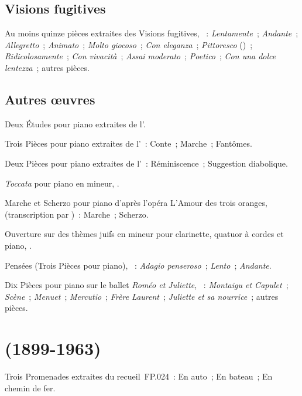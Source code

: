 \subsection{Visions fugitives}

Au moins quinze pièces extraites des Visions fugitives, ~:
 \emph{Lentamente}~;  \emph{Andante}~; 
\emph{Allegretto}~;  \emph{Animato}~;  \emph{Molto
giocoso}~;  \emph{Con eleganza}~;  \emph{Pittoresco}
()~;  \emph{Ridicolosamente}~; 
\emph{Con vivacità}~;  \emph{Assai moderato}~; 
\emph{Poetico}~;  \emph{Con una dolce lentezza}~; autres pièces.

\subsection{Autres œuvres}

Deux Études pour piano extraites de l'.

Trois Pièces pour piano extraites de l'~:  Conte~;
 Marche~;  Fantômes.

Deux Pièces pour piano extraites de l'~:  Réminiscence~;
 Suggestion diabolique.

\emph{Toccata} pour piano en \kD mineur, .

Marche et Scherzo pour piano d'après l'opéra L'\hbox{Amour} des trois
oranges,  (transcription par \Prokofiev{})~:  Marche~;
 Scherzo.

Ouverture sur des thèmes juifs en \kC mineur pour clarinette, quatuor à
cordes et piano, .

Pensées (Trois Pièces pour piano), ~:  \emph{Adagio
penseroso}~;  \emph{Lento}~;  \emph{Andante}.

Dix Pièces pour piano sur le ballet \emph{Roméo et Juliette}, ~:
\emph{Montaigu et Capulet}~; \emph{Scène}~; \emph{Menuet}~;
\emph{Mercutio}~; \emph{Frère Laurent}~; \emph{Juliette et sa nourrice}~;
autres pièces.

\section[%
Francis Poulenc (1899-1963)]{%
\FPoulenc{} (1899-1963)}

Trois Promenades extraites du recueil~FP.024~:  En auto~;
 En bateau~;  En chemin de fer.

